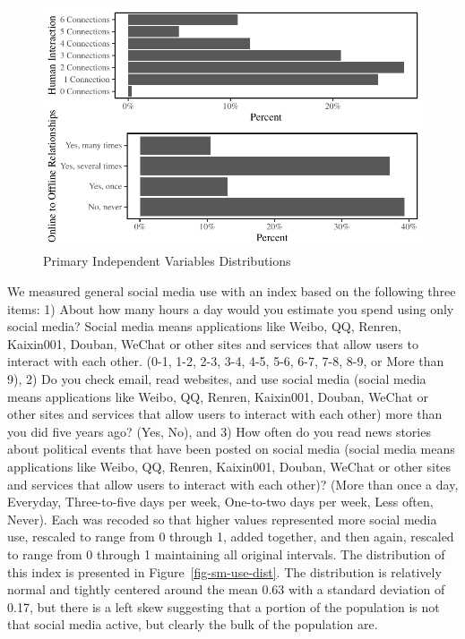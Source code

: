 \documentclass[
  letterpaper,
  DIV=11,
  numbers=noendperiod]{scrartcl}
\begin{document}
\begin{figure}

{\centering \includegraphics{Social-Isolation-in-China_files/figure-pdf/fig-var-dist-1.pdf}

}

\caption{\label{fig-var-dist}Primary Independent Variables
Distributions}

\end{figure}

We measured general social media use with an index based on the
following three items: 1) About how many hours a day would you estimate
you spend using only social media? Social media means applications like
Weibo, QQ, Renren, Kaixin001, Douban, WeChat or other sites and services
that allow users to interact with each other. (0-1, 1-2, 2-3, 3-4, 4-5,
5-6, 6-7, 7-8, 8-9, or More than 9), 2) Do you check email, read
websites, and use social media (social media means applications like
Weibo, QQ, Renren, Kaixin001, Douban, WeChat or other sites and services
that allow users to interact with each other) more than you did five
years ago? (Yes, No), and 3) How often do you read news stories about
political events that have been posted on social media (social media
means applications like Weibo, QQ, Renren, Kaixin001, Douban, WeChat or
other sites and services that allow users to interact with each other)?
(More than once a day, Everyday, Three-to-five days per week, One-to-two
days per week, Less often, Never). Each was recoded so that higher
values represented more social media use, rescaled to range from 0
through 1, added together, and then again, rescaled to range from 0
through 1 maintaining all original intervals. The distribution of this
index is presented in Figure~\ref{fig-sm-use-dist}. The distribution is
relatively normal and tightly centered around the mean 0.63 with a
standard deviation of 0.17, but there is a left skew suggesting that a
portion of the population is not that social media active, but clearly
the bulk of the population are.
\end{document}
